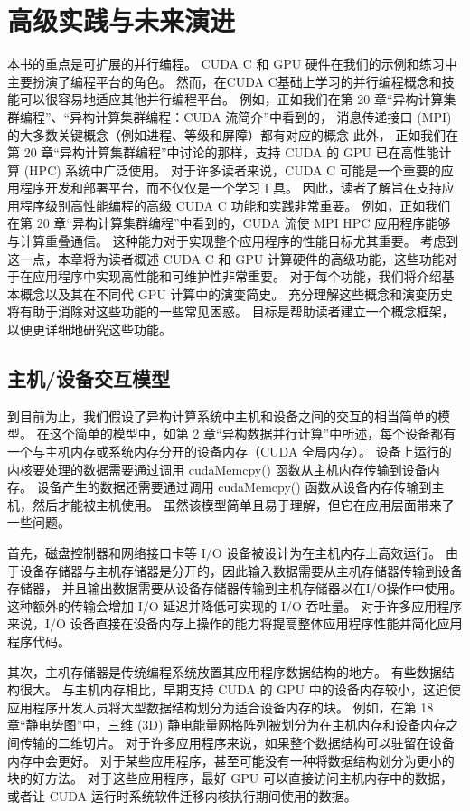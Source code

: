 \section{高级实践与未来演进}
本书的重点是可扩展的并行编程。 CUDA C 和 GPU 硬件在我们的示例和练习中主要扮演了编程平台的角色。 
然而，在CUDA C基础上学习的并行编程概念和技能可以很容易地适应其他并行编程平台。 
例如，正如我们在第 20 章“异构计算集群编程”、“异构计算集群编程：CUDA 流简介”中看到的，
消息传递接口 (MPI) 的大多数关键概念（例如进程、等级和屏障）都有对应的概念 此外，
正如我们在第 20 章“异构计算集群编程”中讨论的那样，支持 CUDA 的 GPU 已在高性能计算 (HPC) 系统中广泛使用。 
对于许多读者来说，CUDA C 可能是一个重要的应用程序开发和部署平台，而不仅仅是一个学习工具。 
因此，读者了解旨在支持应用程序级别高性能编程的高级 CUDA C 功能和实践非常重要。 
例如，正如我们在第 20 章“异构计算集群编程”中看到的，CUDA 流使 MPI HPC 应用程序能够与计算重叠通信。 
这种能力对于实现整个应用程序的性能目标尤其重要。 
考虑到这一点，本章将为读者概述 CUDA C 和 GPU 计算硬件的高级功能，这些功能对于在应用程序中实现高性能和可维护性非常重要。 
对于每个功能，我们将介绍基本概念以及其在不同代 GPU 计算中的演变简史。 
充分理解这些概念和演变历史将有助于消除对这些功能的一些常见困惑。 目标是帮助读者建立一个概念框架，以便更详细地研究这些功能。

\subsection{主机/设备交互模型}
到目前为止，我们假设了异构计算系统中主机和设备之间的交互的相当简单的模型。 
在这个简单的模型中，如第 2 章“异构数据并行计算”中所述，每个设备都有一个与主机内存或系统内存分开的设备内存（CUDA 全局内存）。 
设备上运行的内核要处理的数据需要通过调用 cudaMemcpy() 函数从主机内存传输到设备内存。 
设备产生的数据还需要通过调用 cudaMemcpy() 函数从设备内存传输到主机，然后才能被主机使用。 
虽然该模型简单且易于理解，但它在应用层面带来了一些问题。

首先，磁盘控制器和网络接口卡等 I/O 设备被设计为在主机内存上高效运行。 
由于设备存储器与主机存储器是分开的，因此输入数据需要从主机存储器传输到设备存储器，
并且输出数据需要从设备存储器传输到主机存储器以在I/O操作中使用。 这种额外的传输会增加 I/O 延迟并降低可实现的 I/O 吞吐量。 
对于许多应用程序来说，I/O 设备直接在设备内存上操作的能力将提高整体应用程序性能并简化应用程序代码。

其次，主机存储器是传统编程系统放置其应用程序数据结构的地方。 有些数据结构很大。 
与主机内存相比，早期支持 CUDA 的 GPU 中的设备内存较小，这迫使应用程序开发人员将大型数据结构划分为适合设备内存的块。 
例如，在第 18 章“静电势图”中，三维 (3D) 静电能量网格阵列被划分为在主机内存和设备内存之间传输的二维切片。 
对于许多应用程序来说，如果整个数据结构可以驻留在设备内存中会更好。 
对于某些应用程序，甚至可能没有一种将数据结构划分为更小的块的好方法。 
对于这些应用程序，最好 GPU 可以直接访问主机内存中的数据，或者让 CUDA 运行时系统软件迁移内核执行期间使用的数据。

